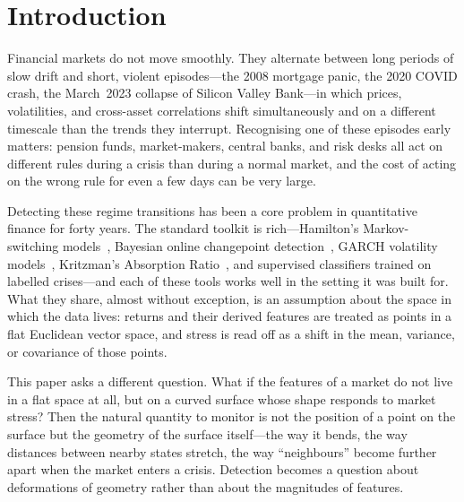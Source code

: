 \documentclass[3p]{elsarticle}
\begin{document}

\section{Introduction}\label{sec:intro}

Financial markets do not move smoothly.  They alternate between long
periods of slow drift and short, violent episodes---the 2008
mortgage panic, the 2020 COVID crash, the March~2023 collapse of
Silicon Valley Bank---in which prices, volatilities, and cross-asset
correlations shift simultaneously and on a different timescale than
the trends they interrupt.  Recognising one of these episodes early
matters: pension funds, market-makers, central banks, and risk
desks all act on different rules during a crisis than during a
normal market, and the cost of acting on the wrong rule for even a
few days can be very large.

Detecting these regime transitions has been a core problem in
quantitative finance for forty years.  The standard toolkit is
rich---Hamilton's Markov-switching
models~\cite{hamilton1989,ang_bekaert2002}, Bayesian online
changepoint detection~\cite{adams_mackay2007}, GARCH volatility
models~\cite{bollerslev1986}, Kritzman's Absorption
Ratio~\cite{kritzman2011}, and supervised classifiers trained on
labelled crises---and each of these tools works well in the setting
it was built for.  What they share, almost without exception, is an
assumption about the space in which the data lives: returns and
their derived features are treated as points in a flat Euclidean
vector space, and stress is read off as a shift in the mean,
variance, or covariance of those points.

This paper asks a different question.  What if the features of a
market do not live in a flat space at all, but on a curved surface
whose shape responds to market stress?  Then the natural quantity
to monitor is not the position of a point on the surface but the
geometry of the surface itself---the way it bends, the way
distances between nearby states stretch, the way ``neighbours''
become further apart when the market enters a crisis.  Detection
becomes a question about deformations of geometry rather than about
the magnitudes of features.
\end{document}

